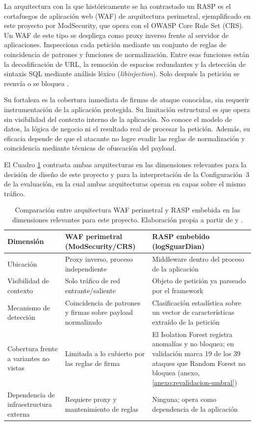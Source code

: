 La arquitectura con la que históricamente se ha contrastado un RASP es el cortafuegos de aplicación web (WAF) de arquitectura perimetral, ejemplificado en este proyecto por ModSecurity, que opera con el OWASP Core Rule Set (CRS). Un WAF de este tipo se despliega como proxy inverso frente al servidor de aplicaciones. Inspecciona cada petición mediante un conjunto de reglas de coincidencia de patrones y funciones de normalización. Entre esas funciones están la decodificación de URL, la remoción de espacios redundantes y la detección de sintaxis SQL mediante análisis léxico (\textit{libinjection}). Solo después la petición se reenvía o se bloquea \parencite{owaspcrs2024}.

Su fortaleza es la cobertura inmediata de firmas de ataque conocidas, sin requerir instrumentación de la aplicación protegida. Su limitación estructural es que opera sin visibilidad del contexto interno de la aplicación. No conoce el modelo de datos, la lógica de negocio ni el resultado real de procesar la petición. Además, su eficacia depende de que el atacante no logre evadir las reglas de normalización y coincidencia mediante técnicas de ofuscación del payload.

El Cuadro \ref{cuadro:waf_vs_rasp} contrasta ambas arquitecturas en las dimensiones relevantes para la decisión de diseño de este proyecto y para la interpretación de la Configuración~3 de la evaluación, en la cual ambas arquitecturas operan en capas sobre el mismo tráfico.

\begin{table}[ht]
\small
\begin{tabular}{|p{2.6cm}|p{5.3cm}|p{5.3cm}|}
\hline
\textbf{Dimensión} & \textbf{WAF perimetral (ModSecurity/CRS)} & \textbf{RASP embebido (logSguarDian)} \\ \hline
Ubicación & Proxy inverso, proceso independiente & Middleware dentro del proceso de la aplicación \\ \hline
Visibilidad de contexto & Solo tráfico de red entrante/saliente & Objeto de petición ya parseado por el framework \\ \hline
Mecanismo de detección & Coincidencia de patrones y firmas sobre payload normalizado & Clasificación estadística sobre un vector de características extraído de la petición \\ \hline
Cobertura frente a variantes no vistas & Limitada a lo cubierto por las reglas de firma & El Isolation Forest registra anomalías y no bloquea; en validación marca 19 de los 39 ataques que Random Forest no bloquea (anexo, \ref{anexo:revalidacion-umbral}) \\ \hline
Dependencia de infraestructura externa & Requiere proxy y mantenimiento de reglas & Ninguna; opera como dependencia de la aplicación \\ \hline
\end{tabular}
\caption[Comparación entre arquitectura WAF perimetral y RASP embebida]{Comparación entre arquitectura WAF perimetral y RASP embebida en las dimensiones relevantes para este proyecto. Elaboración propia a partir de \textcite{yuan2012} y \textcite{owaspcrs2024}.}
\label{cuadro:waf_vs_rasp}
\end{table}

